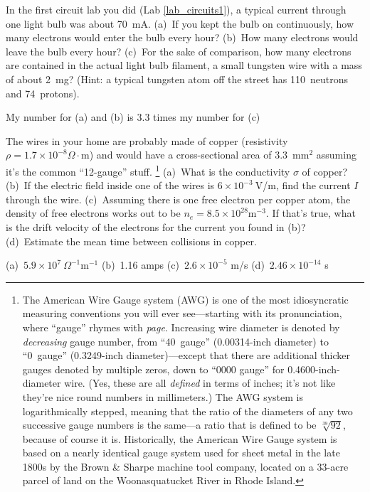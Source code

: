 \begin{Exercise}
In the first circuit lab you did (Lab \ref{lab_circuits1}), a typical current through one light bulb was about 70~mA.  
(a)~If you kept the bulb on continuously, how many electrons would enter the bulb every hour? 
(b)~How many electrons would leave the bulb every hour?  
(c)~For the sake of comparison, how many electrons are contained in the actual light bulb filament, a small tungsten wire with a mass of about 2~mg? 
(Hint: a typical tungsten atom off the street has 110~neutrons and 74~protons).
\end{Exercise}
\begin{Answer}
My number for (a) and (b) is 3.3 times my number for (c)
\end{Answer}


\begin{Exercise}
The wires in your home are probably made of copper (resistivity $\rho = 1.7 \times 10^{-8} \Omega \cdot \text{m}$) and would have a cross-sectional area of 3.3~mm$^2$ assuming it's the common ``12-gauge'' stuff.%
\footnote{The American Wire Gauge system (AWG) is one of the most idiosyncratic measuring conventions you will ever see---starting with its pronunciation, where ``gauge'' rhymes with \textit{page}.  Increasing wire diameter is denoted by \textit{decreasing} gauge number, from ``40~gauge'' (0.00314-inch diameter) to ``0~gauge'' (0.3249-inch diameter)---except that there are additional thicker gauges denoted by multiple zeros, down to ``0000 gauge'' for 0.4600-inch-diameter wire.  (Yes, these are all \textit{defined} in terms of inches; it's not like they're nice round numbers in millimeters.) The AWG system is logarithmically stepped, meaning that the ratio of the diameters of any two successive gauge numbers is the same---a ratio that is defined to be $\sqrt[39]{92}$, because of course it is. Historically, the American Wire Gauge system is based on a nearly identical gauge system used for sheet metal in the late 1800s by the Brown \& Sharpe machine tool company, located on a 33-acre parcel of land on the Woonasquatucket River in Rhode Island.}
(a)~What is the conductivity $\sigma$ of copper? 
(b)~If the electric field inside one of the wires is $6 \times 10^{-3}~$V/m, find the current $I$ through the wire. 
(c)~Assuming there is one free electron per copper atom, the density of free electrons works out to be $n_e = 8.5 \times 10^{28} \text{m}^{-3}$.  If that's true, what is the drift velocity of the electrons for the current you found in (b)? 
(d)~Estimate the mean time between collisions in copper.  
\end{Exercise}
\begin{Answer}
(a)~$5.9 \times 10^7 ~\Omega^{-1}\text{m}^{-1} $
(b)~1.16 amps 
(c)~$2.6 \times 10^{-5}$ m/s 
(d)~$2.46 \times 10^{-14}$ s
\end{Answer}


